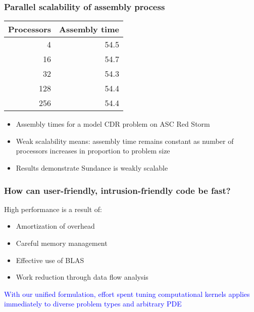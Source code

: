 \documentclass[10pt,xcolor=dvipsnames]{beamer}
\begin{document}
\frame
{
  \frametitle{Parallel scalability of assembly process}

  \begin{block}{}
  \begin{center}
  \begin{tabular}{|r|r|} \hline
  Processors & Assembly time \\ \hline
  4   &  54.5 \\ \hline
  16  &  54.7 \\ \hline
  32  &  54.3   \\ \hline
  128 &  54.4   \\ \hline
  256 &  54.4  \\ \hline
  \end{tabular}
  \end{center}
  \begin{itemize}
  \item Assembly times for a model CDR problem on ASC Red Storm
  \item Weak scalability means: assembly time remains constant as number of
processors increases in proportion to problem size
  \item Results demonstrate Sundance is weakly scalable
  \end{itemize}
  \end{block}

}


\frame
{
  \frametitle{How can user-friendly, intrusion-friendly code be fast?}

  \begin{block}{High performance is a result of:}
  \begin{itemize}
  \item Amortization of overhead
  \item Careful memory management
  \item Effective use of BLAS
  \item Work reduction through data flow analysis
  \end{itemize}
 \begin{center}
\textcolor{blue}
 {With our unified formulation, effort spent tuning computational kernels applies
immediately to diverse problem types and arbitrary PDE}
 \end{center}
  \end{block}

}
\end{document}
